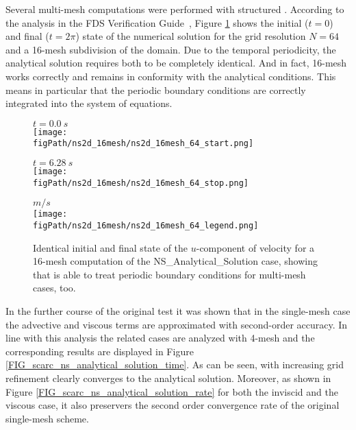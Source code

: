 Several multi-mesh computations were performed with structured \scarcdefault{}.
According to the analysis in the FDS Verification Guide~\cite{McGrattan:2018:VG}, Figure \ref{FIG_scarc_ns_analytical_solution_uvel} shows the initial ($t=0$) and final ($t=2\pi$) state of the numerical solution 
for the grid resolution $N=64$ and a 16-mesh subdivision of the domain. 
Due to the temporal periodicity, the analytical solution requires both to be completely identical.
And in fact, 16-mesh \scarcdefault{} works correctly and remains in conformity with the analytical conditions.
This means in particular that the periodic boundary conditions are correctly integrated into the system of equations.
%
\begin{figure}[ht]
\begin{center}
%
\begin{minipage}{0.4\textwidth}
\begin{center}
$t=0.0~s$\\[1ex]
\texttt{[image: \\figPath/ns2d\_16mesh/ns2d\_16mesh\_64\_start.png]}
\end{center}
\end{minipage}
\begin{minipage}{0.4\textwidth}
\begin{center}
$t=6.28~s$ \\[1ex]
\texttt{[image: \\figPath/ns2d\_16mesh/ns2d\_16mesh\_64\_stop.png]}
\end{center}
\end{minipage}
\begin{minipage}{0.1\textwidth}
\begin{center}
\quad $m/s$ \\[1ex]
\texttt{[image: \\figPath/ns2d\_16mesh/ns2d\_16mesh\_64\_legend.png]}
\end{center}
\end{minipage}
%
\end{center}
\caption[16-mesh \scarc{} computation of the {\ct NS\_Analytical\_Solution} case]{Identical initial and final state of the $u$-component of velocity for a 16-mesh \scarc{} computation of the {\ct NS\_Analytical\_Solution} case, showing that \scarc{} is able to treat periodic boundary conditions for multi-mesh cases, too.}
\label{FIG_scarc_ns_analytical_solution_uvel}
\end{figure}

In the further course of the original test it was shown that in the single-mesh case %
the advective and viscous terms are approximated with second-order accuracy. In line with this analysis the related cases are analyzed with 4-mesh \scarcdefault{} and
the corresponding results are displayed in Figure \ref{FIG_scarc_ns_analytical_solution_time}. 
As can be seen, with increasing grid refinement \scarc{} clearly converges to the analytical solution. Moreover, as shown in 
Figure \ref{FIG_scarc_ns_analytical_solution_rate} for both the inviscid and the viscous case, it also preservers the second order convergence rate of the original single-mesh scheme. 

